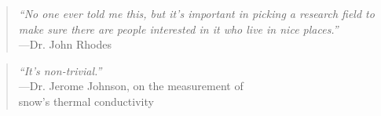 \vspace{2in}

\begin{quotation}
  {\it ``No one ever told me this, but it's important in picking a research field to make sure there are people interested in it who live in nice places.''} \\
  \hspace*{1in}---Dr. John Rhodes
\end{quotation}

\vspace{1in}

\begin{quotation}
  {\it ``It's non-trivial.''} \\ 
  \hspace*{1in}---Dr. Jerome Johnson, on the measurement of\\ 
  \hspace*{1.2in}snow's thermal conductivity
\end{quotation}
